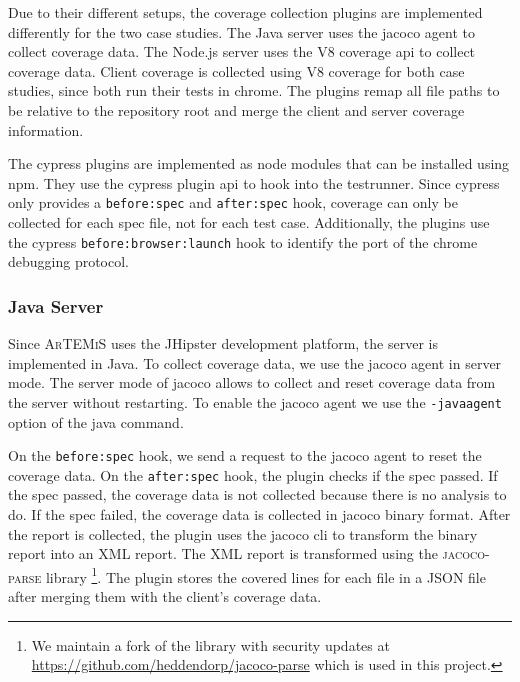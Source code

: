 Due to their different setups, the coverage collection plugins are implemented differently for the two case studies.
The Java server uses the jacoco agent to collect coverage data.
The Node.js server uses the V8 coverage \ac{api} to collect coverage data.
Client coverage is collected using V8 coverage for both case studies, since both run their tests in chrome.
The plugins remap all file paths to be relative to the repository root and merge the client and server coverage information.

The cypress plugins are implemented as node modules that can be installed using npm.
They use the cypress plugin \ac{api} \autocite{cypressio_writing_nodate} to hook into the testrunner.
Since cypress only provides a \texttt{before:spec} and \texttt{after:spec} hook, coverage can only be collected for each spec file, not for each test case.
Additionally, the plugins use the cypress \texttt{before:browser:launch} hook to identify the port of the chrome debugging protocol.
\subsubsection{Java Server}
Since \textsc{ArTEMiS} uses the JHipster \autocite{jhipster_jhipster_nodate} development platform, the server is implemented in Java.
To collect coverage data, we use the jacoco agent \autocite{noauthor_jacoco_nodate} in server mode.
The server mode of jacoco allows to collect and reset coverage data from the server without restarting.
To enable the jacoco agent we use the \texttt{-javaagent} option of the java command.

On the \texttt{before:spec} hook, we send a request to the jacoco agent to reset the coverage data.
On the \texttt{after:spec} hook, the plugin checks if the spec passed.
If the spec passed, the coverage data is not collected because there is no analysis to do.
If the spec failed, the coverage data is collected in jacoco binary format.
After the report is collected, the plugin uses the jacoco \ac{cli} to transform the binary report into an XML report.
The XML report is transformed using the \textsc{jacoco-parse} library \autocite{noauthor_jacoco-parse_2023}\footnote{We maintain a fork of the library with security updates at \url{https://github.com/heddendorp/jacoco-parse} which is used in this project.}.
The plugin stores the covered lines for each file in a JSON file after merging them with the client's coverage data.

